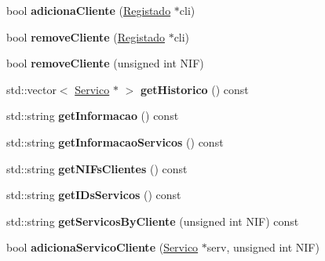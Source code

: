 \begin{DoxyCompactItemize}
\item 
\mbox{\label{class_empresa_ae9df2a1a1d8bf2ac64d08a88a13f0c5f}} 
bool {\bfseries adiciona\+Cliente} (\hyperlink{class_registado}{Registado} $\ast$cli)
\item 
\mbox{\label{class_empresa_aec387d18fb6dc010738c5d878cff1645}} 
bool {\bfseries remove\+Cliente} (\hyperlink{class_registado}{Registado} $\ast$cli)
\item 
\mbox{\label{class_empresa_ad92331511c58763afed45f668421454c}} 
bool {\bfseries remove\+Cliente} (unsigned int N\+IF)
\item 
\mbox{\label{class_empresa_a1f97b7763f0d4977192713a6350d45c4}} 
std\+::vector$<$ \hyperlink{class_servico}{Servico} $\ast$ $>$ {\bfseries get\+Historico} () const
\item 
\mbox{\label{class_empresa_a31c9add956cf208592c82e600389ebec}} 
std\+::string {\bfseries get\+Informacao} () const
\item 
\mbox{\label{class_empresa_a3a0b6dad40b7f05fede47be28dfc024d}} 
std\+::string {\bfseries get\+Informacao\+Servicos} () const
\item 
\mbox{\label{class_empresa_a670edd3a8103ef4136a5d59054018278}} 
std\+::string {\bfseries get\+N\+I\+Fs\+Clientes} () const
\item 
\mbox{\label{class_empresa_a601351adee76c9258438f841a41c5eaa}} 
std\+::string {\bfseries get\+I\+Ds\+Servicos} () const
\item 
\mbox{\label{class_empresa_af40fde81230d4c58c678c3bfb6b1b35b}} 
std\+::string {\bfseries get\+Servicos\+By\+Cliente} (unsigned int N\+IF) const
\item 
\mbox{\label{class_empresa_ae7e7f8be439aa63d7c6b174818260e32}} 
bool {\bfseries adiciona\+Servico\+Cliente} (\hyperlink{class_servico}{Servico} $\ast$serv, unsigned int N\+IF)
\item 
\mbox{\label{class_empresa_a17638d7cbc03ab5f6e0a4a57bb99ca56}} 

\end{DoxyCompactItemize}
